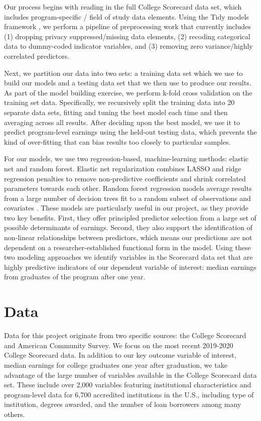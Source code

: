 \documentclass[a4paper, 12pt]{article}
\begin{document}
Our process begins with reading in the full College Scorecard data set, which includes program-specific / field of study data elements. Using the Tidy models framework \parencite{Kuhn_Silge_2022}, we perform a pipeline of preprocessing work that currently includes (1) dropping privacy suppressed/missing data elements, (2) recoding categorical data to dummy-coded indicator variables, and (3) removing zero variance/highly correlated predictors.

Next, we partition our data into two sets: a training data set which we use to build our models and a testing data set that we then use to produce our results. As part of the model building exercise, we perform k-fold cross validation on the training set data. Specifically, we recursively split the training data into 20 separate data sets, fitting and tuning the best model each time and then averaging across all results. After deciding upon the best model, we use it to predict program-level earnings using the held-out testing data, which prevents the kind of over-fitting that can bias results too closely to particular samples.

For our models, we use two regression-based, machine-learning methods: elastic net and random forest. Elastic net regularization combines LASSO and ridge regression penalties to remove non-predictive coefficients and shrink correlated parameters towards each other. Random forest regression models average results from a large number of decision trees fit to a random subset of observations and covariates \parencite{Hastie_etal_2016}. These models are particularly useful in our project, as they provide two key benefits. First, they offer principled predictor selection from a large set of possible determinants of earnings. Second, they also support the identification of non-linear relationships between predictors, which means our predictions are not dependent on a researcher-established functional form in the model. Using these two modeling approaches we identify variables in the Scorecard data set that are highly predictive indicators of our dependent variable of interest: median earnings from graduates of the program after one year.


\section*{Data}

Data for this project originate from two specific sources: the College Scorecard and American Community Survey. We focus on the most recent 2019-2020 College Scorecard data. In addition to our key outcome variable of interest, median earnings for college graduates one year after graduation, we take advantage of the large number of variables available in the College Scorecard data set. These include over 2,000 variables featuring institutional characteristics and program-level data for 6,700 accredited institutions in the U.S., including type of institution, degrees awarded, and the number of loan borrowers among many others.
\end{document}
